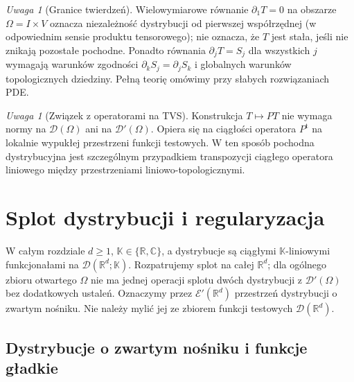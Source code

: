 \documentclass[11pt,a4paper]{article}
\numberwithin{equation}{section}
\theoremstyle{plain}
\theoremstyle{definition}
\theoremstyle{remark}
\newtheorem{uwaga}[twierdzenie]{Uwaga}
\newcommand{\R}{\mathbb R}
\newcommand{\C}{\mathbb C}
\newcommand{\K}{\mathbb K}
\begin{document}
\begin{uwaga}[Granice twierdzeń]
\label{rem:limits20}
Wielowymiarowe równanie $\partial_1T=0$ na obszarze
$\Omega=I\times V$ oznacza niezależność dystrybucji od
pierwszej współrzędnej (w odpowiednim sensie produktu
tensorowego); nie oznacza, że $T$ jest stała, jeśli
nie znikają pozostałe pochodne. Ponadto równania
$\partial_jT=S_j$ dla wszystkich $j$ wymagają warunków
zgodności $\partial_kS_j=\partial_jS_k$ i globalnych
warunków topologicznych dziedziny. Pełną teorię
omówimy przy słabych rozwiązaniach PDE.
\end{uwaga}

\begin{uwaga}[Związek z operatorami na TVS]
\label{rem:tvs-derivative20}
Konstrukcja $T\mapsto PT$ nie wymaga normy na
$\mathcal D(\Omega)$ ani na $\mathcal D'(\Omega)$.
Opiera się na ciągłości operatora $P^{\mathrm t}$ na
lokalnie wypukłej przestrzeni funkcji testowych.
W ten sposób pochodna dystrybucyjna jest szczególnym
przypadkiem transpozycji ciągłego operatora liniowego
między przestrzeniami liniowo-topologicznymi.
\end{uwaga}


\setcounter{section}{20}
\section{Splot dystrybucji i regularyzacja}
\label{sec:splot21}

W całym rozdziale $d\ge1$, $\K\in\{\R,\C\}$, a dystrybucje
są ciągłymi $\K$-liniowymi funkcjonałami na
$\mathcal D(\R^d;\K)$. Rozpatrujemy splot na całej
$\R^d$; dla ogólnego zbioru otwartego $\Omega$ nie ma
jednej operacji splotu dwóch dystrybucji z
$\mathcal D'(\Omega)$ bez dodatkowych ustaleń.
Oznaczymy przez $\mathcal E'(\R^d)$ przestrzeń dystrybucji
o zwartym nośniku. Nie należy mylić jej ze zbiorem funkcji
testowych $\mathcal D(\R^d)$.

\subsection{Dystrybucje o zwartym nośniku i funkcje gładkie}
\end{document}
